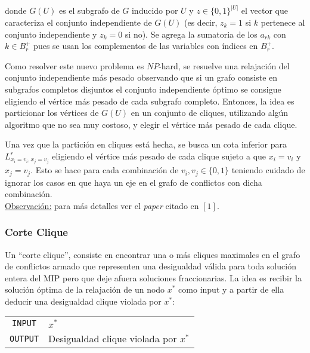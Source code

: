 donde $G(U)$ es el subgrafo de $G$ inducido por $U$ y $z\in \{0,1\}^{|U|}$ el vector que caracteriza el conjunto independiente de $G(U)$ (es decir, $z_k = 1$ si $k$ pertenece al conjunto independiente y $z_k = 0$ si no). Se agrega la sumatoria de los $a_{rk}$ con $k\in B^+_r$ pues se usan los complementos de las variables con \'indices en $B^+_r$. 

Como resolver este nuevo problema es $NP$-hard, se resuelve una relajaci\'on del conjunto independiente m\'as pesado observando que si un grafo consiste en subgrafos completos disjuntos el conjunto independiente \'optimo se consigue eligiendo el v\'ertice m\'as pesado de cada subgrafo completo. Entonces, la idea es particionar los v\'ertices de $G(U)$ en un conjunto de cliques, utilizando alg\'un algoritmo que no sea muy costoso, y elegir el v\'ertice m\'as pesado de cada clique.

Una vez que la partici\'on en cliques está hecha, se busca un cota inferior para $L^r_{x_i=v_i,x_j=v_j}$ eligiendo el v\'ertice m\'as pesado de cada clique sujeto a que $x_i = v_i$ y $x_j = v_j$. Esto se hace para cada combinaci\'on de $v_i,v_j\in \{0,1\}$ teniendo cuidado de ignorar los casos en que haya un eje en el grafo de conflictos con dicha combinaci\'on.\\

{\footnotesize\underline{Observación:} para más detalles ver el \emph{paper} citado en $[1]$.}

\subsubsection*{Corte Clique}

Un ``corte clique'', consiste en encontrar una o m\'as cliques maximales en el grafo de conflictos armado que representen una desigualdad válida para toda solución entera del MIP pero que deje afuera soluciones fraccionarias. La idea es recibir la solución óptima de la relajación de un nodo $x^*$ como input y a partir de ella deducir una desigualdad clique violada por $x^*$:\\

{
\centering
\begin{tabular}{c l}
\verb_INPUT_ & $x^*$\\
\verb_OUTPUT_ & Desigualdad clique violada por $x^*$\\
\end{tabular}\\
\vspace{5mm}
}

